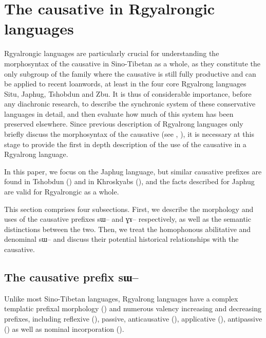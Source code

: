 \documentclass[oldfontcommands,oneside,a4paper,11pt]{article}
\newcommand{\ipa}[1]{{\phon \mbox{#1}}} %
\begin{document}

\section{The causative in Rgyalrongic languages}



Rgyalrongic languages are particularly crucial for understanding the morphosyntax of the causative in Sino-Tibetan as a whole, as they constitute the only subgroup of the family where the causative is still fully productive and can be applied to recent loanwords, at least in the four core Rgyalrong languages Situ, Japhug, Tshobdun and Zbu. It is thus of considerable importance, before any diachronic research, to describe the synchronic system of these conservative languages in detail, and then evaluate how much of this system has been preserved elsewhere. Since previous description of Rgyalrong languages only briefly discuss the morphosyntax of the causative (see \citealt{jackson06paisheng}, \citealt{jacques08zh}), it is necessary at this stage to provide the first in depth description of the use of the causative in a Rgyalrong language.

In this paper, we focus on the Japhug language, but similar causative prefixes are found in Tshobdun (\citealt{jackson06paisheng, jackson14morpho}) and in Khroskyabs (\citealt{lai13affixale,lai14caus}), and the facts described for Japhug are  valid for Rgyalrongic as a whole.

This section comprises four subsections. First, we describe the morphology and uses of the causative prefixes \ipa{sɯ--} and \ipa{ɣɤ--} respectively, as well as the semantic distinctions between the two. Then, we treat the homophonous abilitative and denominal \ipa{sɯ--} and discuss their potential historical relationships with the causative.





\subsection{The causative prefix  \ipa{sɯ--}}

Unlike most Sino-Tibetan languages, Rgyalrong languages have a complex templatic prefixal morphology (\citealt{jacques13harmonization}) and numerous valency increasing and decreasing prefixes, including reflexive (\citealt{jacques10refl}), passive, anticausative (\citealt{jacques12demotion}), applicative (\citealt{jacques13tropative}), antipassive (\citealt{jacques14antipassive}) as well as nominal incorporation (\citealt{jacques12incorp}).
\end{document}
